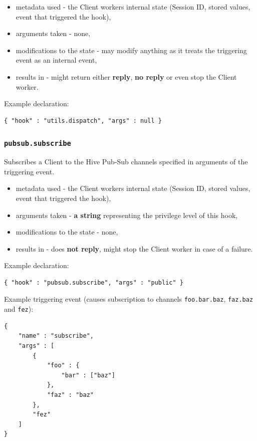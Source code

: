 \documentclass[a4paper]{article}
\begin{document}
\begin{itemize}
\item metadata used - the Client workers internal state (Session ID, stored values, event that triggered the hook),
\item arguments taken - none,
\item modifications to the state - may modify anything as it treats the triggering event as an internal event,
\item results in - might return either \textbf{reply}, \textbf{no reply} or even stop the Client worker.
\end{itemize}

\noindent
Example declaration:

\begin{verbatim}
{ "hook" : "utils.dispatch", "args" : null }
\end{verbatim}
\subsubsection{\texttt{pubsub.subscribe}}
\label{sec-8-2-4}
\label{ref-hook_pubsub}


Subscribes a Client to the Hive Pub-Sub channels specified in arguments of the triggering event.


\begin{itemize}
\item metadata used - the Client workers internal state (Session ID, stored values, event that triggered the hook),
\item arguments taken - \textbf{a string} representing the privilege level of this hook,
\item modifications to the state - none,
\item results in - does \textbf{not reply}, might stop the Client worker in case of a failure.
\end{itemize}

\noindent
Example declaration:

\begin{verbatim}
{ "hook" : "pubsub.subscribe", "args" : "public" }
\end{verbatim}




\noindent
Example triggering event (causes subscription to channels \texttt{foo.bar.baz}, \texttt{faz.baz} and \texttt{fez}):


\begin{verbatim}
{
    "name" : "subscribe",
    "args" : [
        {
            "foo" : {
                "bar" : ["baz"]
            },
            "faz" : "baz"
        },
        "fez"
    ]
}
\end{verbatim}
\end{document}
